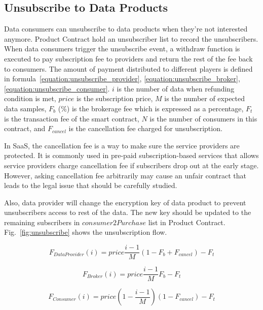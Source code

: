 \documentclass[conference]{IEEEtran}
\begin{document}
\subsection{Unsubscribe to Data Products}
Data consumers can unsubscribe to data products when they're not interested anymore. Product Contract hold an unsubscriber list to record the unsubscribers. When data consumers trigger the unsubscribe event, a withdraw function is executed to pay subscription fee to providers and return the rest of the fee back to consumers. The amount of payment distributed to different players is defined in formula~\ref{equation:unsubscribe_provider}, \ref{equation:unsubscribe_broker}, \ref{equation:unsubscribe_consumer}. $i$ is the number of data when refunding condition is met, $price$  is the subscription price, $M$ is the number of expected data samples, $F_{b}$ (\%) is the brokerage fee which is expressed as a percentage, $F_{t}$ is the transaction fee of the smart contract, $N$ is the number of consumers in this contract, and $F_{cancel}$ is the cancellation fee charged for unsubscription. 

In SaaS, the cancellation fee is a way to make sure the service providers are protected. It is commonly used in pre-paid subscription-based services that allows service providers charge cancellation fee if subscribers drop out at the early stage. However, asking cancellation fee arbitrarily may cause an unfair contract that leads to the legal issue that should be carefully studied.

Also, data provider will change the encryption key of data product to prevent unsubscribers access to rest of the data. The new key should be updated to the remaining subscribers in $consumer2Purchase$ list in Product Contract. Fig.~\ref{fig:unsubscribe} shows the unsubscription flow.

\begin{equation}
\label{equation:unsubscribe_provider}
    F_{DataProvider}(i) = price \frac{i-1}{M} (1-F_{b}+F_{cancel}) -F_{t} 
\end{equation}

\begin{equation}
\label{equation:unsubscribe_broker}
    F_{Broker}(i) = price \frac{i-1}{M} F_{b} -F_{t}
\end{equation}

\begin{equation}
\label{equation:unsubscribe_consumer}
    F_{Consumer}(i) = price (1-\frac{i-1}{M})(1 -F_{cancel}) -F_{t}
\end{equation}
\end{document}
